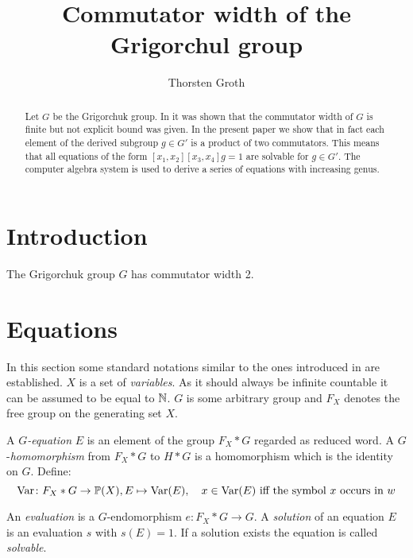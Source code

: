 \documentclass[a4paper,12pt]{article}
\title{Commutator width of the Grigorchul group}
\author{Thorsten Groth}
\begin{document}
\maketitle
%

\begin{abstract}
Let $G$ be the Grigorchuk group. In \cite{Lysenok:QudraticEquationsInGrig} it was shown that the commutator width of $G$ is finite but not explicit bound was given.
In the present paper we show that in fact each element of the derived subgroup $g\in G'$ is a product of two commutators. This means that all equations
of the form $[x_1,x_2][x_3,x_4]g=1$ are solvable for $g\in G'$. The computer algebra system \cite{GAP4} is used to derive a series of equations with increasing 
genus. 
\end{abstract}
\tableofcontents
\section{Introduction}
\begin{thm}
 The Grigorchuk group $G$ has commutator width 2.
\end{thm}

\section{Equations}
In this section some standard notations similar to the ones introduced in\cite{ComerfordEquationsFreeGroups} are established.
$X$ is a set of \emph{variables}. As it should always be infinite countable it can be assumed to be equal to $\mathbb{N}$. $G$ is some
arbitrary group and $F_X$ denotes the free group on the generating set $X$.

A $G$\emph{-equation} $E$ is an element of the group $F_X * G$ regarded as reduced word.
A $G$-\emph{homomorphism} from $F_X * G$ to $H*G$ is a homomorphism which is the identity on $G$.
Define:
\[\textup{Var} \colon F_X * G \to \mathbb{P}(X), E \mapsto \textup{Var}(E), \quad x\in \textup{Var}(E) \textup{ iff the symbol $x$ occurs in $w$}\]

An \emph{evaluation} is a $G$-endomorphism $e\colon F_X * G \to G$.
A \emph{solution} of an equation $E$ is an evaluation $s$ with $s(E)=1$. If a solution exists the equation is called \emph{solvable}.
\end{document}
